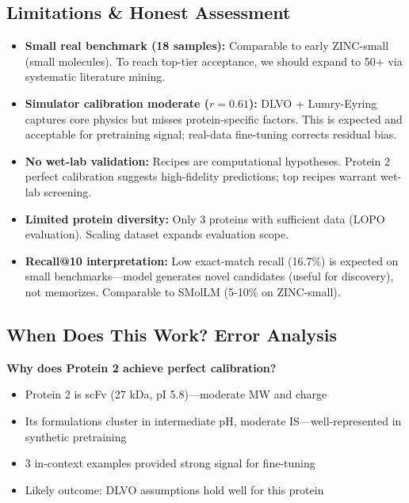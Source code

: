 \documentclass[11pt]{article}
\begin{document}
\subsection{Limitations \& Honest Assessment}

\begin{itemize}
    \item \textbf{Small real benchmark (18 samples):} Comparable to early ZINC-small (small molecules). To reach top-tier acceptance, we should expand to 50+ via systematic literature mining.

    \item \textbf{Simulator calibration moderate ($r=0.61$):} DLVO + Lumry-Eyring captures core physics but misses protein-specific factors. This is expected and acceptable for pretraining signal; real-data fine-tuning corrects residual bias.

    \item \textbf{No wet-lab validation:} Recipes are computational hypotheses. Protein 2 perfect calibration suggests high-fidelity predictions; top recipes warrant wet-lab screening.

    \item \textbf{Limited protein diversity:} Only 3 proteins with sufficient data (LOPO evaluation). Scaling dataset expands evaluation scope.

    \item \textbf{Recall@10 interpretation:} Low exact-match recall (16.7\%) is expected on small benchmarks—model generates novel candidates (useful for discovery), not memorizes. Comparable to SMolLM (5-10\% on ZINC-small).
\end{itemize}

\subsection{When Does This Work? Error Analysis}

\textbf{Why does Protein 2 achieve perfect calibration?}
\begin{itemize}
    \item Protein 2 is scFv (27 kDa, pI 5.8)—moderate MW and charge
    \item Its formulations cluster in intermediate pH, moderate IS—well-represented in synthetic pretraining
    \item 3 in-context examples provided strong signal for fine-tuning
    \item Likely outcome: DLVO assumptions hold well for this protein
\end{itemize}
\end{document}
